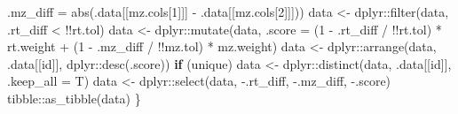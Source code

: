 \documentclass[
]{article}
\newenvironment{Shaded}{\begin{snugshade}}{\end{snugshade}}
\newcommand{\AttributeTok}[1]{\textcolor[rgb]{0.77,0.63,0.00}{#1}}
\newcommand{\ControlFlowTok}[1]{\textcolor[rgb]{0.13,0.29,0.53}{\textbf{#1}}}
\newcommand{\DecValTok}[1]{\textcolor[rgb]{0.00,0.00,0.81}{#1}}
\newcommand{\FunctionTok}[1]{\textcolor[rgb]{0.00,0.00,0.00}{#1}}
\newcommand{\NormalTok}[1]{#1}
\newcommand{\OtherTok}[1]{\textcolor[rgb]{0.56,0.35,0.01}{#1}}
\newcommand{\SpecialCharTok}[1]{\textcolor[rgb]{0.00,0.00,0.00}{#1}}
\begin{document}
\begin{Shaded}
\begin{Highlighting}[]
      \AttributeTok{.mz\_diff =} \FunctionTok{abs}\NormalTok{(.data[[mz.cols[}\DecValTok{1}\NormalTok{]]] }\SpecialCharTok{{-}}\NormalTok{ .data[[mz.cols[}\DecValTok{2}\NormalTok{]]]))}
\NormalTok{    data }\OtherTok{\textless{}{-}}\NormalTok{ dplyr}\SpecialCharTok{::}\FunctionTok{filter}\NormalTok{(data, .rt\_diff }\SpecialCharTok{\textless{}} \SpecialCharTok{!!}\NormalTok{rt.tol)}
\NormalTok{    data }\OtherTok{\textless{}{-}}\NormalTok{ dplyr}\SpecialCharTok{::}\FunctionTok{mutate}\NormalTok{(data, }\AttributeTok{.score =}\NormalTok{ (}\DecValTok{1} \SpecialCharTok{{-}}\NormalTok{ .rt\_diff }\SpecialCharTok{/} \SpecialCharTok{!!}\NormalTok{rt.tol) }\SpecialCharTok{*}\NormalTok{ rt.weight }\SpecialCharTok{+}
\NormalTok{      (}\DecValTok{1} \SpecialCharTok{{-}}\NormalTok{ .mz\_diff }\SpecialCharTok{/} \SpecialCharTok{!!}\NormalTok{mz.tol) }\SpecialCharTok{*}\NormalTok{ mz.weight)}
\NormalTok{    data }\OtherTok{\textless{}{-}}\NormalTok{ dplyr}\SpecialCharTok{::}\FunctionTok{arrange}\NormalTok{(data, .data[[id]], dplyr}\SpecialCharTok{::}\FunctionTok{desc}\NormalTok{(.score))}
    \ControlFlowTok{if}\NormalTok{ (unique)}
\NormalTok{      data }\OtherTok{\textless{}{-}}\NormalTok{ dplyr}\SpecialCharTok{::}\FunctionTok{distinct}\NormalTok{(data, .data[[id]], }\AttributeTok{.keep\_all =}\NormalTok{ T)}
\NormalTok{    data }\OtherTok{\textless{}{-}}\NormalTok{ dplyr}\SpecialCharTok{::}\FunctionTok{select}\NormalTok{(data, }\SpecialCharTok{{-}}\NormalTok{.rt\_diff, }\SpecialCharTok{{-}}\NormalTok{.mz\_diff, }\SpecialCharTok{{-}}\NormalTok{.score)}
\NormalTok{    tibble}\SpecialCharTok{::}\FunctionTok{as\_tibble}\NormalTok{(data)}
\NormalTok{  \}}


\end{Highlighting}
\end{Shaded}
\end{document}
